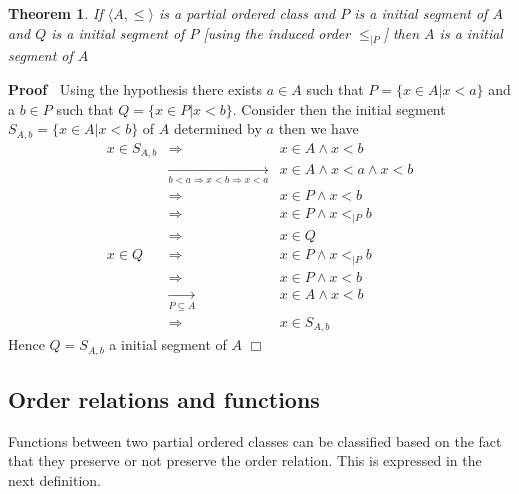 \documentclass{book}
\newcommand{\Rightarrowlim}{\mathop{\rightarrow}\limits}
\newenvironment{proof}{\noindent\textbf{Proof\ }}{\hspace*{\fill}$\Box$\medskip}
\newtheorem{theorem}{Theorem}
\begin{document}
\begin{theorem}
  \label{order intial sergment property}If $\langle A, \leqslant \rangle$ is a
  partial ordered class and $P$ is a initial segment of $A$ and $Q$ is a
  initial segment of $P$ [using the induced order $\leqslant_{|P}$] then $A$
  is a initial segment of $A$
\end{theorem}

\begin{proof}
  Using the hypothesis there exists $a \in A$ such that $P = \{ x \in A|x < a
  \}$ and a $b \in P$ such that $Q = \{ x \in P|x < b \}$. Consider then the
  initial segment $S_{A, b} = \{ x \in A|x < b \}$ of $A$ determined by $a$
  then we have
  \begin{eqnarray*}
    x \in S_{A, b} & \Rightarrow & x \in A \wedge x < b\\
    & \Rightarrowlim_{b < a \Rightarrow x < b \Rightarrow x < a} & x \in A
    \wedge x < a \wedge x < b\\
    & \Rightarrow & x \in P \wedge x < b\\
    & \Rightarrow & x \in P \wedge x <_{|P} b\\
    & \Rightarrow & x \in Q\\
    x \in Q & \Rightarrow & x \in P \wedge x <_{|P} b\\
    & \Rightarrow & x \in P \wedge x < b\\
    & \Rightarrowlim_{P \subseteq A} & x \in A \wedge x < b\\
    & \Rightarrow & x \in S_{A, b}
  \end{eqnarray*}
  Hence $Q = S_{A, b}$ a initial segment of $A$
\end{proof}

\subsection{Order relations and functions}

Functions between two partial ordered classes can be classified based on the
fact that they preserve or not preserve the order relation. This is expressed
in the next definition.
\end{document}
